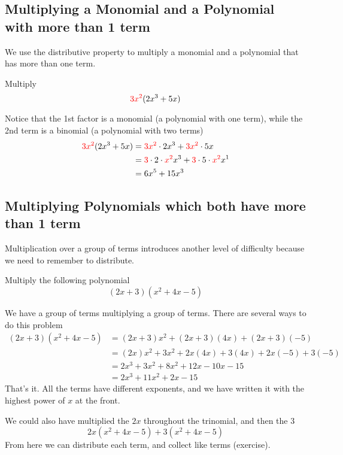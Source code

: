 \subsection{Multiplying a Monomial and a Polynomial with more than 1 term}
We use the distributive property to multiply a monomial and a polynomial that has more than one term.

\begin{myexample}
Multiply
\[
	{\color{red}3x^2}(2x^3+5x)
\]
\end{myexample}
\begin{myProof}
	Notice that the 1st factor is a monomial (a polynomial with one term), while the 2nd
	term is a binomial (a polynomial with two terms)
	\begin{align*}
		{\color{red}3x^2}(2x^3+5x) & =		{\color{red}3x^2}\cdot 2x^3+{\color{red}3x^2}\cdot 5x                                             \\
		                           & =		{\color{red}3}\cdot 2 \cdot {\color{red}x^2}x^3 + {\color{red}3}\cdot 5 \cdot {\color{red}x^2}x^1 \\
		                           & =		6x^5+15x^3                                                                                        
	\end{align*}
\end{myProof}

\subsection{Multiplying Polynomials which both have more than 1 term}
Multiplication over a group of terms introduces another level of difficulty because we need to 
remember to distribute.

\begin{myexample}
Multiply the following polynomial
\[
	(2x+3)(x^2+4x-5)
\]
\end{myexample}
\begin{myProof}
	We have a group of terms multiplying a group of terms. There are several ways to do this problem
	\begin{align*}
		(2x+3)(x^2+4x-5) & =		(2x+3)x^2+(2x+3)(4x)+(2x+3)(-5)        \\
		                 & =		(2x)x^2+3x^2+2x(4x)+3(4x)+2x(-5)+3(-5) \\
		                 & =		2x^3+3x^2+8x^2+12x-10x-15              \\
		                 & =		2x^3+11x^2+2x-15                       
	\end{align*}
	That's it. All the terms have different exponents, and we have written it with the highest
	power of $x$ at the front.
		
	We could also have multiplied the $2x$ throughout the trinomial, and then the $3$
	\[
		2x(x^2+4x-5)+3(x^2+4x-5)
	\]
	From here we can distribute each term, and collect like terms (exercise).
\end{myProof}

